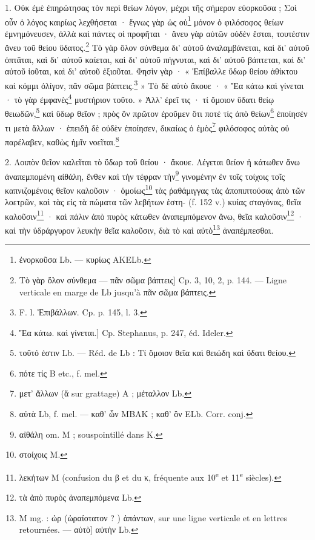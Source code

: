 \documentclass[landscape, a4paper, 11pt, oneside, polutonikogreek, french]{article}
\begin{document}
1. Οὐκ ἐμὲ ἐπηρώτησας τὸν περὶ θείων λόγον, μέχρι τῆς σήμερον εὐορκοῦσα ; Σοὶ οὖν ὁ λόγος καιρίως λεχθήσεται · ἔγνως γὰρ ὡς οὐ\footnote{ἐνορκοῦσα Lb. --- κυρίως AKELb.} μόνον ὁ φιλόσοφος θείων ἐμνημόνευσεν, ἀλλὰ καὶ πάντες οἱ προφῆται · ἄνευ γὰρ αὐτῶν οὐδὲν ἔσται, τουτέστιν ἄνευ τοῦ θείου ὕδατος.\footnote{Τὸ γὰρ ὅλον σύνθεμα --- πᾶν σῶμα βάπτεις] Cp. 3, 10, 2, p. 144. --- Ligne verticale en marge de Lb jusqu'à πᾶν σῶμα βάπτεις.} Τὸ γὰρ ὅλον σύνθεμα δι' αὐτοῦ ἀναλαμβάνεται, καὶ δι' αὐτοῦ ὀπτᾶται, καὶ δι' αὐτοῦ καίεται, καὶ δι' αὐτοῦ πήγνυται, καὶ δι' αὐτοῦ βάπτεται, καὶ δι' αὐτοῦ ἰοῦται, καὶ δι' αὐτοῦ ἐξιοῦται. Φησὶν γὰρ · « Ἐπίβαλλε ὕδωρ θείου ἀθίκτου καὶ κόμμι ὀλίγον, πᾶν σῶμα βάπτεις.\footnote{F. l. Ἐπιβάλλων. Cp. p. 145, l. 3.} » Τὸ δὲ αὐτὸ ἄκουε · « Ἔα κάτω καὶ γίνεται · τὸ γὰρ ἐμφανὲς\footnote{Ἔα κάτω. καὶ γίνεται.] Cp. Stephanus, p. 247, éd. Ideler.} μυστήριον τοῦτο. » Ἀλλ' ἐρεῖ τις · τί ὅμοιον ὕδατι θείῳ θειωδῶν,\footnote{τοῦτό ἐστιν Lb. --- Réd. de Lb : Τί ὅμοιον θεῖα καὶ θειώδη καὶ ὕδατι θείου.} καὶ ὕδωρ θεῖον ; πρὸς ὃν πρῶτον ἐροῦμεν ὅτι ποτέ τίς ἀπὸ θείων\footnote{πότε τίς B etc., f. mel.} ἐποίησέν τι μετὰ ἄλλων · ἐπειδὴ δὲ οὐδὲν ἐποίησεν, δικαίως ὁ ἐμὸς\footnote{μετ' ἄλλων (ἄ sur grattage) A ; μέταλλον Lb.} φιλόσοφος αὐτὰς οὐ παρέλαβεν, καθὼς ἡμῖν νοεῖται.\footnote{αὐτὰ Lb, f. mel. --- καθ' ὧν MBAK ; καθ' ὃν ELb. Corr. conj.}

2. Λοιπὸν θεῖον καλεῖται τὸ ὕδωρ τοῦ θείου · ἄκουε. Λέγεται θείον ἡ κάτωθεν ἄνω ἀναπεμπομένη αἰθάλη, ἔνθεν καὶ τὴν τέφραν τὴν\footnote{αἰθάλη om. M ; souspointillé dans K.} γινομένην ἐν τοῖς τοίχοις τοῖς καπνιζομένοις θεῖον καλοῦσιν · ὁμοίως\footnote{στοίχοις M.} τὰς ῥαθάμιγγας τὰς ἀποπιπτούσας ἀπὸ τῶν λοετρῶν, καὶ τὰς εἰς τὰ πώματα τῶν λεβήτων ἑστη- (f. 152 v.) κυίας σταγόνας, θεῖα καλοῦσιν\footnote{λεκήτων M (confusion du β et du κ, fréquente aux 10\textsuperscript{e} et 11\textsuperscript{e} siècles).} · καὶ πάλιν ἀπὸ πυρὸς κάτωθεν ἀναπεμπόμενον ἄνω, θεῖα καλοῦσιν\footnote{τὰ ἀπὸ πυρὸς ἀναπεμπόμενα Lb.} · καὶ τὴν ὑδράργυρον λευκὴν θεῖα καλοῦσιν, διὰ τὸ καὶ αὐτὸ\footnote{M mg. : ὡρ (ὡραίοτατον ? ) ἁπάντων, sur une ligne verticale et en lettres retournées. --- αὐτὸ] αὐτὴν Lb.} ἀναπέμπεσθαι.
\end{document}
